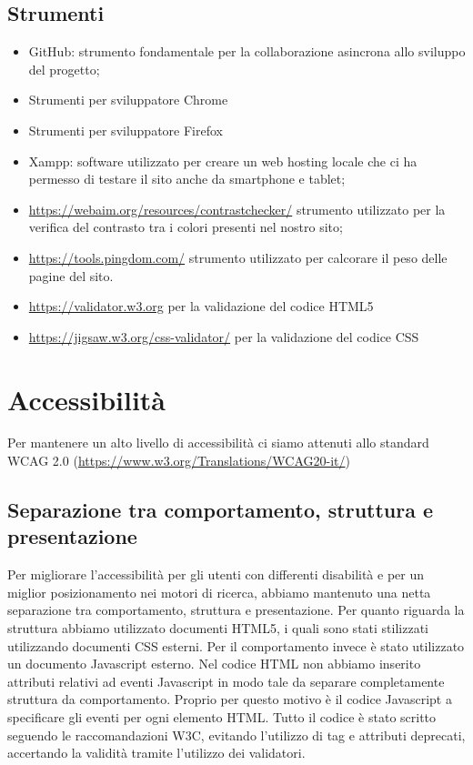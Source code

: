 \documentclass[a4paper]{article}
\begin{document}
	\subsection{Strumenti}
	\begin{itemize}
		\item GitHub: strumento fondamentale per la collaborazione asincrona allo sviluppo del progetto;
		\item Strumenti per sviluppatore Chrome
		\item Strumenti per sviluppatore Firefox
		\item Xampp: software utilizzato per creare un web hosting locale che ci ha permesso di testare il sito anche da smartphone e tablet;
		\item \href{https://webaim.org/resources/contrastchecker/}{https://webaim.org/resources/contrastchecker/} strumento utilizzato per la verifica del contrasto tra i colori presenti nel nostro sito;
		\item \href{https://tools.pingdom.com/}{https://tools.pingdom.com/} strumento utilizzato per calcorare il peso delle pagine del sito.
		\item \href{https://validator.w3.org}{https://validator.w3.org} per la validazione del codice HTML5
		\item \href{https://jigsaw.w3.org/css-validator/}{https://jigsaw.w3.org/css-validator/} per la validazione del codice CSS
	\end{itemize}

	\section{Accessibilità}
	Per mantenere un alto livello di accessibilità ci siamo attenuti allo standard WCAG 2.0 (\href{https://www.w3.org/Translations/WCAG20-it/}{https://www.w3.org/Translations/WCAG20-it/})

	\subsection{Separazione tra comportamento, struttura e presentazione}
	Per migliorare l'accessibilità per gli utenti con differenti disabilità e per un miglior posizionamento nei motori di ricerca, abbiamo mantenuto una netta separazione tra comportamento, struttura e presentazione.
	Per quanto riguarda la struttura abbiamo utilizzato documenti HTML5, i quali sono stati stilizzati utilizzando documenti CSS esterni. Per il comportamento invece è stato utilizzato un documento Javascript esterno.
	Nel codice HTML non abbiamo inserito attributi relativi ad eventi Javascript in modo tale da separare completamente struttura da comportamento. Proprio per questo motivo è il codice Javascript a specificare gli eventi per ogni elemento HTML.
	Tutto il codice è stato scritto seguendo le raccomandazioni W3C, evitando l'utilizzo di tag e attributi deprecati, accertando la validità tramite l'utilizzo dei validatori.
\end{document}
